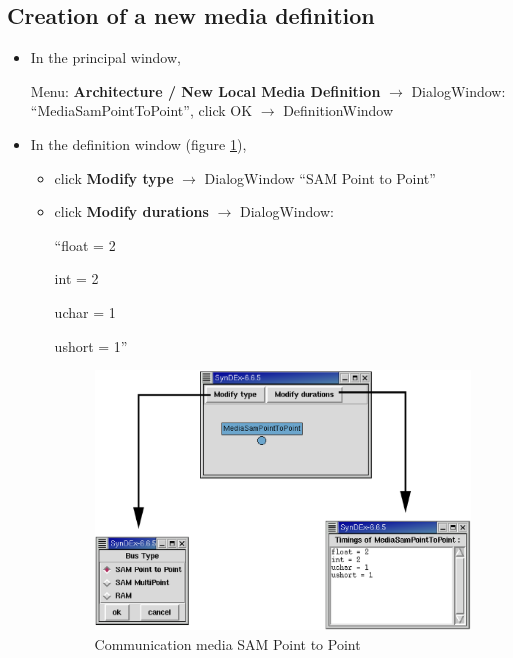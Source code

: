 \documentclass[a4paper,twoside]{report}
\begin{document}
\subsection{Creation of a new media definition}

\begin{itemize}
\item In the principal window, 

Menu: \textbf{Architecture / New Local Media Definition} $\rightarrow$
DialogWindow: ``MediaSamPointToPoint'', click OK $\rightarrow$ DefinitionWindow

\item In the definition window (figure \ref{mediaSPP}), 
\begin{itemize}
\item click \textbf{Modify type} $\rightarrow$ DialogWindow ``SAM Point to
Point''

\item click \textbf{Modify durations} $\rightarrow$ DialogWindow: 

``float = 2

\hspace{4pt}int = 2

\hspace{4pt}uchar = 1

\hspace{4pt}ushort = 1''

\begin{figure}[htbp]
  \begin{center} 
        \includegraphics[width=\linewidth]{Media_of_communication_SPP.eps} 
  \end{center}
  
  \caption{Communication media SAM Point to Point} 
  \label{mediaSPP}
\end{figure}
\end{itemize}
\end{itemize}
\end{document}
